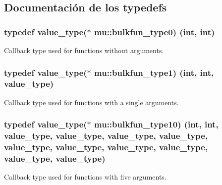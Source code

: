 \subsection{Documentación de los \textquotesingle{}typedefs\textquotesingle{}}
\subsubsection[{\texorpdfstring{bulkfun\+\_\+type0}{bulkfun_type0}}]{\setlength{\rightskip}{0pt plus 5cm}typedef {\bf value\+\_\+type}($\ast$ mu\+::bulkfun\+\_\+type0) (int, int)}\hypertarget{namespacemu_aff9adf757e90a2398326a3cb10585cf1}{}\label{namespacemu_aff9adf757e90a2398326a3cb10585cf1}


Callback type used for functions without arguments. 

\subsubsection[{\texorpdfstring{bulkfun\+\_\+type1}{bulkfun_type1}}]{\setlength{\rightskip}{0pt plus 5cm}typedef {\bf value\+\_\+type}($\ast$ mu\+::bulkfun\+\_\+type1) (int, int, {\bf value\+\_\+type})}\hypertarget{namespacemu_a2bd588710432e6e34eae3e2af4ba3862}{}\label{namespacemu_a2bd588710432e6e34eae3e2af4ba3862}


Callback type used for functions with a single arguments. 

\subsubsection[{\texorpdfstring{bulkfun\+\_\+type10}{bulkfun_type10}}]{\setlength{\rightskip}{0pt plus 5cm}typedef {\bf value\+\_\+type}($\ast$ mu\+::bulkfun\+\_\+type10) (int, int, {\bf value\+\_\+type}, {\bf value\+\_\+type}, {\bf value\+\_\+type}, {\bf value\+\_\+type}, {\bf value\+\_\+type}, {\bf value\+\_\+type}, {\bf value\+\_\+type}, {\bf value\+\_\+type}, {\bf value\+\_\+type}, {\bf value\+\_\+type})}\hypertarget{namespacemu_aebd99bafbd17761a9e13b8a7366ae1ce}{}\label{namespacemu_aebd99bafbd17761a9e13b8a7366ae1ce}


Callback type used for functions with five arguments. 

